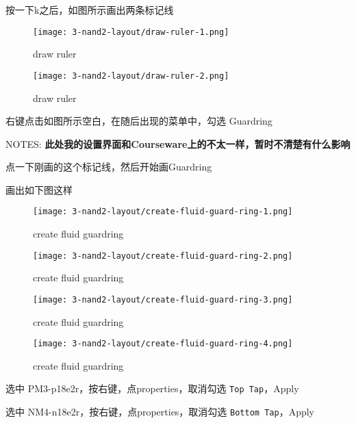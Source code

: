 \documentclass{theme-2614084}
\begin{document}
按一下k之后，如图所示画出两条标记线

\begin{figure}[H]
  \centering\texttt{[image: 3-nand2-layout/draw-ruler-1.png]}
  \caption{draw ruler}
\end{figure}

\begin{figure}[H]
  \centering\texttt{[image: 3-nand2-layout/draw-ruler-2.png]}
  \caption{draw ruler}
\end{figure}

右键点击如图所示空白，在随后出现的菜单中，勾选 Guardring

NOTES: \textbf{此处我的设置界面和Courseware上的不太一样，暂时不清楚有什么影响}

点一下刚画的这个标记线，然后开始画Guardring

画出如下图这样

\begin{figure}[htbp]
  \centering\begin{minipage}[t]{0.48\textwidth}
      \centering\texttt{[image: 3-nand2-layout/create-fluid-guard-ring-1.png]}
      \caption{create fluid guardring}
  \end{minipage}
  \centering\begin{minipage}[t]{0.48\textwidth}
      \centering\texttt{[image: 3-nand2-layout/create-fluid-guard-ring-2.png]}
      \caption{create fluid guardring}
  \end{minipage}
\end{figure}

\begin{figure}[htbp]
  \centering\begin{minipage}[t]{0.48\textwidth}
      \centering\texttt{[image: 3-nand2-layout/create-fluid-guard-ring-3.png]}
      \caption{create fluid guardring}
  \end{minipage}
  \centering\begin{minipage}[t]{0.48\textwidth}
      \centering\texttt{[image: 3-nand2-layout/create-fluid-guard-ring-4.png]}
      \caption{create fluid guardring}
  \end{minipage}
\end{figure}

选中 PM3-p18e2r，按右键，点properties，取消勾选 \texttt{Top Tap}，Apply

选中 NM4-n18e2r，按右键，点properties，取消勾选 \texttt{Bottom Tap}，Apply
\end{document}
